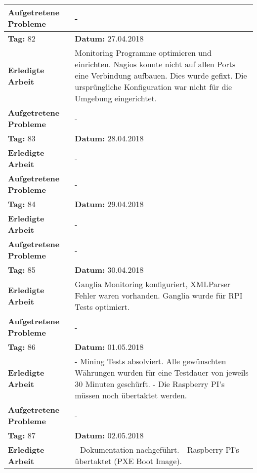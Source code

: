\begin{longtable}{|p{5cm}|p{5cm}p{6cm}|}
\textbf{Aufgetretene Probleme} & \multicolumn{2}{p{11cm}|}{-} \\ \hline
\rowcolor{heading}\textbf{Tag:} 82 & \textbf{Datum:} 27.04.2018 & \\ \hline
\textbf{Erledigte Arbeit} & \multicolumn{2}{p{11cm}|}{Monitoring Programme optimieren und einrichten. Nagios konnte nicht auf allen Ports eine Verbindung aufbauen. Dies wurde gefixt. Die ursprüngliche Konfiguration war nicht für die Umgebung eingerichtet.} \\ \hline
\textbf{Aufgetretene Probleme} & \multicolumn{2}{p{11cm}|}{-} \\ \hline
\rowcolor{heading}\textbf{Tag:} 83 & \textbf{Datum:} 28.04.2018 & \\ \hline
\textbf{Erledigte Arbeit} & \multicolumn{2}{p{11cm}|}{-} \\ \hline
\textbf{Aufgetretene Probleme} & \multicolumn{2}{p{11cm}|}{-} \\ \hline
\rowcolor{heading}\textbf{Tag:} 84 & \textbf{Datum:} 29.04.2018 & \\ \hline
\textbf{Erledigte Arbeit} & \multicolumn{2}{p{11cm}|}{-} \\ \hline
\textbf{Aufgetretene Probleme} & \multicolumn{2}{p{11cm}|}{-} \\ \hline
\rowcolor{heading}\textbf{Tag:} 85 & \textbf{Datum:} 30.04.2018 & \\ \hline
\textbf{Erledigte Arbeit} & \multicolumn{2}{p{11cm}|}{Ganglia Monitoring konfiguriert, XMLParser Fehler waren vorhanden. Ganglia wurde für RPI Tests optimiert.} \\ \hline
\textbf{Aufgetretene Probleme} & \multicolumn{2}{p{11cm}|}{-} \\ \hline
\rowcolor{heading}\textbf{Tag:} 86 & \textbf{Datum:} 01.05.2018 & \\ \hline
\textbf{Erledigte Arbeit} & \multicolumn{2}{p{11cm}|}{- Mining Tests absolviert. Alle gewünschten Währungen wurden für eine Testdauer von jeweils 30 Minuten geschürft. \newline
- Die Raspberry PI's müssen noch übertaktet werden.} \\ \hline
\textbf{Aufgetretene Probleme} & \multicolumn{2}{p{11cm}|}{-} \\ \hline
\rowcolor{heading}\textbf{Tag:} 87 & \textbf{Datum:} 02.05.2018 & \\ \hline
\textbf{Erledigte Arbeit} & \multicolumn{2}{p{11cm}|}{- Dokumentation nachgeführt. \newline
- Raspberry PI's übertaktet (PXE Boot Image).} \\ \hline

\end{longtable}

